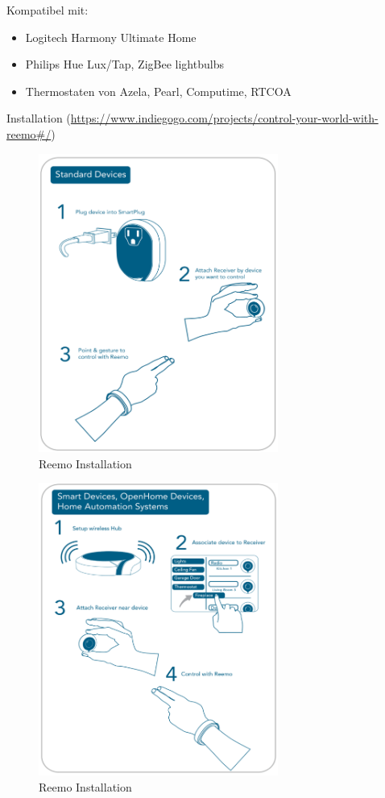 \noindent
Kompatibel mit:
\begin{itemize}
\item Logitech Harmony Ultimate Home
\item Philips Hue Lux/Tap, ZigBee lightbulbs
\item Thermostaten von Azela, Pearl, Computime, RTCOA
\end{itemize}

\noindent
Installation (\url{https://www.indiegogo.com/projects/control-your-world-with-reemo#/})

\begin{figure}[h!]
	\centering
	\includegraphics[width=0.7\textwidth]{img/Feedback-Mechanismen/ReemoInstallation1.png}
	\caption{Reemo Installation}
	\label{fig:feedbackReemoInstallation1}
\end{figure}

\begin{figure}[h!]
	\centering
	\includegraphics[width=0.7\textwidth]{img/Feedback-Mechanismen/ReemoInstallation2.png}
	\caption{Reemo Installation}
	\label{fig:feedbackReemoInstallation2}
\end{figure}

